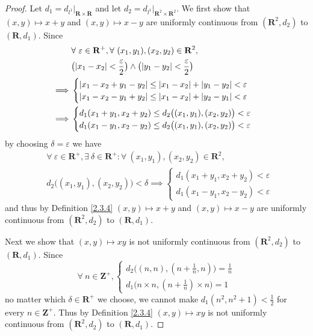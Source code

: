 \begin{proof}
    Let \(d_1 = d_{l^1}|_{\mathbf{R} \times \mathbf{R}}\) and let \(d_2 = d_{l^1}|_{\mathbf{R}^2 \times \mathbf{R}^2}\).
    We first show that \((x, y) \mapsto x + y\) and \((x, y) \mapsto x - y\) are uniformly continuous from \((\mathbf{R}^2, d_2)\) to \((\mathbf{R}, d_1)\).
    Since
    \begin{align*}
                 & \forall\ \varepsilon \in \mathbf{R}^+, \forall\ (x_1, y_1), (x_2, y_2) \in \mathbf{R}^2,                    \\
                 & \big(\abs*{x_1 - x_2} < \frac{\varepsilon}{2}\big) \land \big(\abs*{y_1 - y_2} < \frac{\varepsilon}{2}\big) \\
        \implies & \begin{cases}
            \abs*{x_1 - x_2 + y_1 - y_2} \leq \abs*{x_1 - x_2} + \abs*{y_1 - y_2} < \varepsilon \\
            \abs*{x_1 - x_2 - y_1 + y_2} \leq \abs*{x_1 - x_2} + \abs*{y_2 - y_1} < \varepsilon \\
        \end{cases}                                                                                  \\
        \implies & \begin{cases}
            d_1(x_1 + y_1, x_2 + y_2) \leq d_2\big((x_1, y_1), (x_2, y_2)\big) < \varepsilon \\
            d_1(x_1 - y_1, x_2 - y_2) \leq d_2\big((x_1, y_1), (x_2, y_2)\big) < \varepsilon
        \end{cases}
    \end{align*}
    by choosing \(\delta = \varepsilon\) we have
    \begin{align*}
         & \forall\ \varepsilon \in \mathbf{R}^+, \exists\ \delta \in \mathbf{R}^+ : \forall\ (x_1, y_1), (x_2, y_2) \in \mathbf{R}^2, \\
         & d_2\big((x_1, y_1), (x_2, y_2)\big) < \delta \implies \begin{cases}
            d_1(x_1 + y_1, x_2 + y_2) < \varepsilon \\
            d_1(x_1 - y_1, x_2 - y_2) < \varepsilon
        \end{cases}
    \end{align*}
    and thus by Definition \ref{2.3.4} \((x, y) \mapsto x + y\) and \((x, y) \mapsto x - y\) are uniformly continuous from \((\mathbf{R}^2, d_2)\) to \((\mathbf{R}, d_1)\).

    Next we show that \((x, y) \mapsto xy\) is not uniformly continuous from \((\mathbf{R}^2, d_2)\) to \((\mathbf{R}, d_1)\).
    Since
    \[
        \forall\ n \in \mathbf{Z}^+, \begin{cases}
            d_2\big((n, n), (n + \frac{1}{n}, n)\big) = \frac{1}{n} \\
            d_1\big(n \times n, (n + \frac{1}{n}) \times n\big) = 1
        \end{cases}
    \]
    no matter which \(\delta \in \mathbf{R}^+\) we choose, we cannot make \(d_1(n^2, n^2 + 1) < \frac{1}{2}\) for every \(n \in \mathbf{Z}^+\).
    Thus by Definition \ref{2.3.4} \((x, y) \mapsto xy\) is not uniformly continuous from \((\mathbf{R}^2, d_2)\) to \((\mathbf{R}, d_1)\).


\end{proof}
